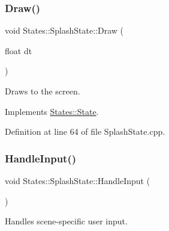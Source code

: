 \subsubsection{\texorpdfstring{Draw()}{Draw()}}
{\footnotesize\ttfamily void States\+::\+Splash\+State\+::\+Draw (\begin{DoxyParamCaption}\item[{float}]{dt }\end{DoxyParamCaption})\hspace{0.3cm}{\ttfamily [virtual]}}



Draws to the screen. 

\begin{DoxyVerb}\end{DoxyVerb}
 

Implements \mbox{\hyperlink{class_states_1_1_state_af5faf0a12478e595ec488fa6108fa490}{States\+::\+State}}.



Definition at line 64 of file Splash\+State.\+cpp.


\begin{DoxyCode}{0}

\end{DoxyCode}
\mbox{\label{class_states_1_1_splash_state_a0bd8d0bc42837fa395cc3bc5c53935f2}} 
\subsubsection{\texorpdfstring{HandleInput()}{HandleInput()}}
{\footnotesize\ttfamily void States\+::\+Splash\+State\+::\+Handle\+Input (\begin{DoxyParamCaption}{ }\end{DoxyParamCaption})\hspace{0.3cm}{\ttfamily [virtual]}}



Handles scene-\/specific user input. 

\begin{DoxyVerb}\end{DoxyVerb}
 

